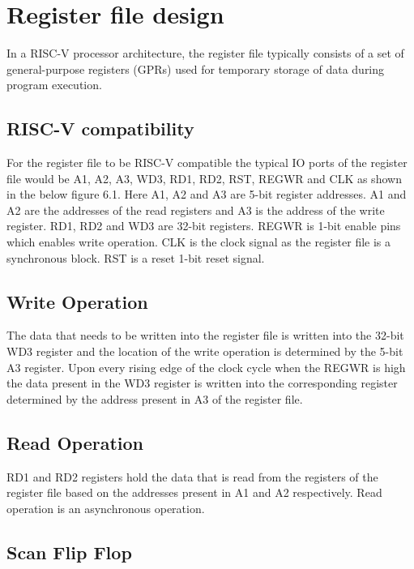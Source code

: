 \section{Register file design}

In a RISC-V processor architecture, the register file typically consists of a set of general-purpose registers (GPRs) used for temporary storage of data during program execution. 

\subsection{RISC-V compatibility } 

For the register file to be RISC-V compatible the typical IO ports of the register file would be A1, A2, A3, WD3, RD1, RD2, RST, REGWR and CLK as shown in the below figure 6.1. Here A1, A2 and A3 are 5-bit register addresses. A1 and A2 are the addresses of the read registers and A3 is the address of the write register. RD1, RD2 and WD3 are 32-bit registers. REGWR is 1-bit enable pins which enables write operation. CLK is the clock signal as the register file is a synchronous block. RST is a reset 1-bit reset signal.

\subsection{Write Operation} 

The data that needs to be written into the register file is written into the 32-bit WD3 register and the location of the write operation is determined by the 5-bit A3 register. Upon every rising edge of the clock cycle when the REGWR is high the data present in the WD3 register is written into the corresponding register determined by the address present in A3 of the register file.

\subsection{Read Operation} 

RD1 and RD2 registers hold the data that is read from the registers of the register file based on the addresses present in A1 and A2 respectively. Read operation is an asynchronous operation.

\subsection{Scan Flip Flop} 

